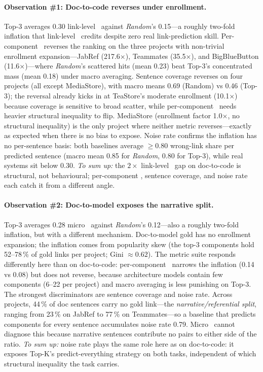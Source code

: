 \paragraph{Observation \#1: Doc-to-code reverses under enrollment.}
Top-3 averages 0.30 link-level \fone\ against \emph{Random}'s 0.15---a roughly two-fold inflation that link-level \fone\ credits despite zero real link-prediction skill.
Per-component \fone\ reverses the ranking on the three projects with non-trivial enrollment expansion---JabRef (217.6$\times$), Teammates (35.5$\times$), and BigBlueButton (11.6$\times$)---where \emph{Random}'s scattered hits (mean 0.23) beat Top-3's concentrated mass (mean 0.18) under macro averaging.
Sentence coverage reverses on four projects (all except MediaStore), with macro means 0.69 (Random) vs 0.46 (Top-3); the reversal already kicks in at TeaStore's moderate enrollment (10.1$\times$) because coverage is sensitive to broad scatter, while per-component \fone\ needs heavier structural inequality to flip.
MediaStore (enrollment factor 1.0$\times$, no structural inequality) is the only project where neither metric reverses---exactly as expected when there is no bias to expose.
Noise rate confirms the inflation has no per-sentence basis: both baselines average $\geq 0.80$ wrong-link share per predicted sentence (macro mean 0.85 for \emph{Random}, 0.80 for Top-3), while real systems sit below 0.30.
\emph{To sum up:} the $2\times$ link-level \fone\ gap on doc-to-code is structural, not behavioural; per-component \fone, sentence coverage, and noise rate each catch it from a different angle.

\paragraph{Observation \#2: Doc-to-model exposes the narrative split.}
Top-3 averages 0.28 micro \fone\ against \emph{Random}'s 0.12---also a roughly two-fold inflation, but with a different mechanism.
Doc-to-model gold has no enrollment expansion; the inflation comes from popularity skew (the top-3 components hold 52--78\,\% of gold links per project; Gini $\approx 0.62$).
The metric suite responds differently here than on doc-to-code: per-component \fone\ narrows the inflation (0.14 vs 0.08) but does not reverse, because architecture models contain few components (6--22 per project) and macro averaging is less punishing on Top-3.
The strongest discriminators are sentence coverage and noise rate.
Across projects, 44\,\% of doc sentences carry no gold link---the \emph{narrative/referential split}, ranging from 23\,\% on JabRef to 77\,\% on Teammates---so a baseline that predicts components for every sentence accumulates noise rate 0.79.
Micro \fone\ cannot diagnose this because narrative sentences contribute no pairs to either side of the ratio.
\emph{To sum up:} noise rate plays the same role here as on doc-to-code: it exposes Top-K's predict-everything strategy on both tasks, independent of which structural inequality the task carries.

